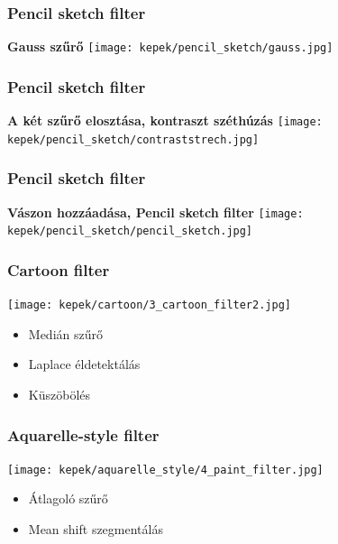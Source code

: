 \documentclass{beamer}
\begin{document}
\begin{frame}[fragile]
\frametitle{Pencil sketch filter}
\begin{center}
\textbf{Gauss szűrő}
\texttt{[image: kepek/pencil\_sketch/gauss.jpg]}
\end{center}
\end{frame}

\begin{frame}[fragile]
\frametitle{Pencil sketch filter}
\begin{center}
\textbf{A két szűrő elosztása, kontraszt széthúzás}
\texttt{[image: kepek/pencil\_sketch/contraststrech.jpg]}
\end{center}
\end{frame}

\begin{frame}[fragile]
\frametitle{Pencil sketch filter}
\begin{center}
\textbf{Vászon hozzáadása, Pencil sketch filter}
\texttt{[image: kepek/pencil\_sketch/pencil\_sketch.jpg]}
\end{center}
\end{frame}

\begin{frame}[fragile]
\frametitle{Cartoon filter}
\begin{center}
\texttt{[image: kepek/cartoon/3\_cartoon\_filter2.jpg]}
\begin{itemize}
\item Medián szűrő
\item Laplace éldetektálás
\item Küszöbölés
\end{itemize}
\end{center}
\end{frame}


\begin{frame}[fragile]
\frametitle{Aquarelle-style filter}
\begin{center}
\texttt{[image: kepek/aquarelle\_style/4\_paint\_filter.jpg]}
\begin{itemize}
\item Átlagoló szűrő
\item Mean shift szegmentálás
\end{itemize}
\end{center}
\end{frame}
\end{document}
